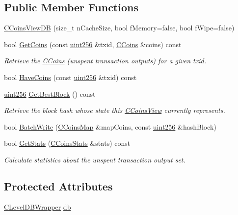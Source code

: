 \subsection*{Public Member Functions}
\begin{DoxyCompactItemize}
\item 
\hyperlink{class_c_coins_view_d_b_a209841b241febcccb2ec584b886ad374}{C\+Coins\+View\+D\+B} (size\+\_\+t n\+Cache\+Size, bool f\+Memory=false, bool f\+Wipe=false)
\item 
bool \hyperlink{class_c_coins_view_d_b_a20655c9c13a6124cdcf210206d518d92}{Get\+Coins} (const \hyperlink{classuint256}{uint256} \&txid, \hyperlink{class_c_coins}{C\+Coins} \&coins) const 
\begin{DoxyCompactList}\small\item\em Retrieve the \hyperlink{class_c_coins}{C\+Coins} (unspent transaction outputs) for a given txid. \end{DoxyCompactList}\item 
bool \hyperlink{class_c_coins_view_d_b_a4d08cf2d3440c1de4e48cfddd67962d7}{Have\+Coins} (const \hyperlink{classuint256}{uint256} \&txid) const 
\item 
\hyperlink{classuint256}{uint256} \hyperlink{class_c_coins_view_d_b_a01777676c2eafd2970a9d53e5fb4a49a}{Get\+Best\+Block} () const 
\begin{DoxyCompactList}\small\item\em Retrieve the block hash whose state this \hyperlink{class_c_coins_view}{C\+Coins\+View} currently represents. \end{DoxyCompactList}\item 
bool \hyperlink{class_c_coins_view_d_b_a33f98ec9323ce48e1704327bc8a2a002}{Batch\+Write} (\hyperlink{coins_8h_a2886ba2fd0428bae777e1cbcabc02834}{C\+Coins\+Map} \&map\+Coins, const \hyperlink{classuint256}{uint256} \&hash\+Block)
\item 
bool \hyperlink{class_c_coins_view_d_b_a6bbe15962b0efd519e30dada872f01c5}{Get\+Stats} (\hyperlink{struct_c_coins_stats}{C\+Coins\+Stats} \&stats) const 
\begin{DoxyCompactList}\small\item\em Calculate statistics about the unspent transaction output set. \end{DoxyCompactList}\end{DoxyCompactItemize}
\subsection*{Protected Attributes}
\begin{DoxyCompactItemize}
\item 
\hyperlink{class_c_level_d_b_wrapper}{C\+Level\+D\+B\+Wrapper} \hyperlink{class_c_coins_view_d_b_aba0a7b26fe82c1a2e80ca060d12fb66a}{db}
\end{DoxyCompactItemize}


